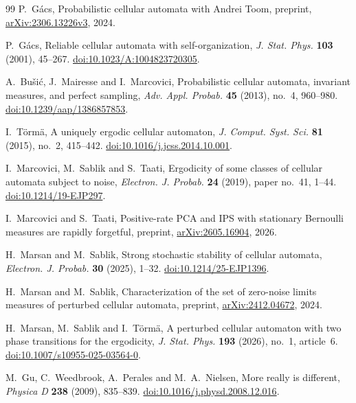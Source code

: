 \begin{thebibliography}{99}
P.~G\'acs,
Probabilistic cellular automata with Andrei Toom,
preprint, \href{https://arxiv.org/abs/2306.13226v3}{arXiv:2306.13226v3}, 2024.

P.~G\'acs,
Reliable cellular automata with self-organization,
\emph{J. Stat. Phys.} \textbf{103} (2001), 45--267.
\href{https://doi.org/10.1023/A:1004823720305}{doi:10.1023/A:1004823720305}.

A.~Bu\v{s}i\'c, J.~Mairesse and I.~Marcovici,
Probabilistic cellular automata, invariant measures, and perfect sampling,
\emph{Adv. Appl. Probab.} \textbf{45} (2013), no.~4, 960--980.
\href{https://doi.org/10.1239/aap/1386857853}{doi:10.1239/aap/1386857853}.

I.~T\"orm\"a,
A uniquely ergodic cellular automaton,
\emph{J. Comput. Syst. Sci.} \textbf{81} (2015), no.~2, 415--442.
\href{https://doi.org/10.1016/j.jcss.2014.10.001}{doi:10.1016/j.jcss.2014.10.001}.

I.~Marcovici, M.~Sablik and S.~Taati,
Ergodicity of some classes of cellular automata subject to noise,
\emph{Electron. J. Probab.} \textbf{24} (2019), paper no.~41, 1--44.
\href{https://doi.org/10.1214/19-EJP297}{doi:10.1214/19-EJP297}.

I.~Marcovici and S.~Taati,
Positive-rate PCA and IPS with stationary Bernoulli measures are rapidly forgetful,
preprint, \href{https://arxiv.org/abs/2605.16904}{arXiv:2605.16904}, 2026.

H.~Marsan and M.~Sablik,
Strong stochastic stability of cellular automata,
\emph{Electron. J. Probab.} \textbf{30} (2025), 1--32.
\href{https://doi.org/10.1214/25-EJP1396}{doi:10.1214/25-EJP1396}.

H.~Marsan and M.~Sablik,
Characterization of the set of zero-noise limits measures of perturbed cellular automata,
preprint, \href{https://arxiv.org/abs/2412.04672}{arXiv:2412.04672}, 2024.

H.~Marsan, M.~Sablik and I.~T\"orm\"a,
A perturbed cellular automaton with two phase transitions for the ergodicity,
\emph{J. Stat. Phys.} \textbf{193} (2026), no.~1, article~6.
\href{https://doi.org/10.1007/s10955-025-03564-0}{doi:10.1007/s10955-025-03564-0}.

M.~Gu, C.~Weedbrook, A.~Perales and M.~A.~Nielsen,
More really is different,
\emph{Physica D} \textbf{238} (2009), 835--839.
\href{https://doi.org/10.1016/j.physd.2008.12.016}{doi:10.1016/j.physd.2008.12.016}.


\end{thebibliography}
